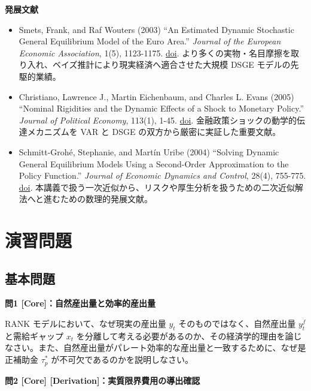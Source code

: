 \documentclass[
  japanese,
  lualatex,
  ja=standard,
  12pt,
  a4paper]{ltjsarticle}
\providecommand{\tightlist}{%
  \setlength{\itemsep}{0pt}\setlength{\parskip}{0pt}}
\begin{document}
\Needspace{0.28\textheight}

\textbf{発展文献}

\begin{itemize}
\tightlist
\item
  Smets, Frank, and Raf Wouters (2003) ``An Estimated Dynamic Stochastic
  General Equilibrium Model of the Euro Area.'' \emph{Journal of the
  European Economic Association}, 1(5), 1123-1175.
  \href{https://doi.org/10.1162/154247603770383415}{doi}.
  より多くの実物・名目摩擦を取り入れ、ベイズ推計により現実経済へ適合させた大規模
  DSGE モデルの先駆的業績。
\item
  Christiano, Lawrence J., Martin Eichenbaum, and Charles L. Evans
  (2005) ``Nominal Rigidities and the Dynamic Effects of a Shock to
  Monetary Policy.'' \emph{Journal of Political Economy}, 113(1), 1-45.
  \href{https://doi.org/10.1086/426038}{doi}.
  金融政策ショックの動学的伝達メカニズムを VAR と DSGE
  の双方から厳密に実証した重要文献。
\item
  Schmitt-Grohé, Stephanie, and Martín Uribe (2004) ``Solving Dynamic
  General Equilibrium Models Using a Second-Order Approximation to the
  Policy Function.'' \emph{Journal of Economic Dynamics and Control},
  28(4), 755-775.
  \href{https://doi.org/10.1016/S0165-1889(03)00043-5}{doi}.
  本講義で扱う一次近似から、リスクや厚生分析を扱うための二次近似解法へと進むための数理的発展文献。
\end{itemize}

\Needspace{0.28\textheight}

\section{演習問題}\label{ux6f14ux7fd2ux554fux984c}

\subsection{基本問題}\label{ux57faux672cux554fux984c}

\textbf{問1 {[}Core{]}：自然産出量と効率的産出量}

RANK モデルにおいて、なぜ現実の産出量 \(y_t\)
そのものではなく、自然産出量 \(y_t^f\) と需給ギャップ \(x_t\)
を分離して考える必要があるのか、その経済学的理由を論じなさい。また、自然産出量がパレート効率的な産出量と一致するために、なぜ是正補助金
\(\tau_p^*\) が不可欠であるのかを説明しなさい。

\Needspace{0.23\textheight}

\textbf{問2 {[}Core{]} {[}Derivation{]}：実質限界費用の導出確認}
\end{document}

